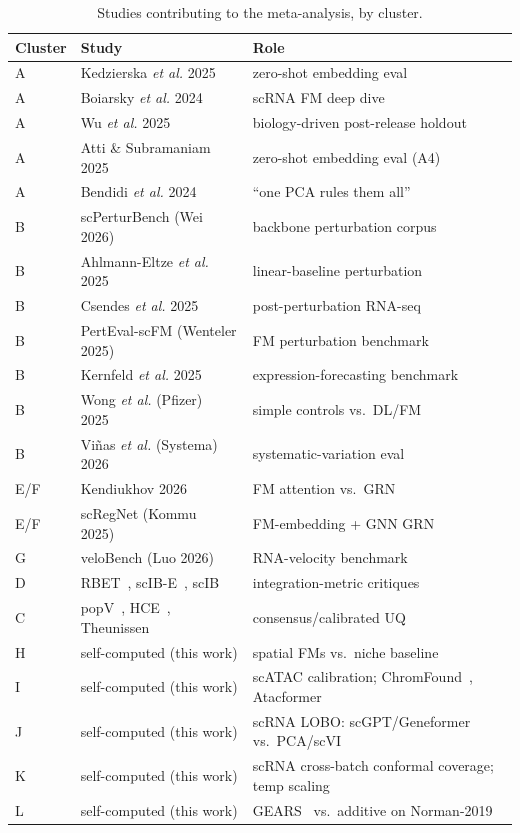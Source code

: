 \documentclass[fleqn,10pt,lineno]{wlpeerj}  %
\begin{document}
\begin{table}[htbp]\centering\footnotesize
\caption{Studies contributing to the meta-analysis, by cluster.}
\label{tab:corpus}
\begin{tabular}{@{}lll@{}}
\toprule
Cluster & Study & Role \\
\midrule
A & Kedzierska \emph{et al.} 2025~\cite{kedzierska2025} & zero-shot embedding eval \\
A & Boiarsky \emph{et al.} 2024~\cite{boiarsky2024} & scRNA FM deep dive \\
A & Wu \emph{et al.} 2025~\cite{wu2025} & biology-driven post-release holdout \\
A & Atti \& Subramaniam 2025~\cite{atti2025} & zero-shot embedding eval (A4) \\
A & Bendidi \emph{et al.} 2024~\cite{bendidi2024} & ``one PCA rules them all'' \\
B & scPerturBench (Wei 2026)~\cite{scperturbench2025} & backbone perturbation corpus \\
B & Ahlmann-Eltze \emph{et al.} 2025~\cite{ahlmann2025} & linear-baseline perturbation \\
B & Csendes \emph{et al.} 2025~\cite{csendes2025} & post-perturbation RNA-seq \\
B & PertEval-scFM (Wenteler 2025)~\cite{perteval2024} & FM perturbation benchmark \\
B & Kernfeld \emph{et al.} 2025~\cite{kernfeld2025} & expression-forecasting benchmark \\
B & Wong \emph{et al.} (Pfizer) 2025~\cite{wongpfizer2025} & simple controls vs.\ DL/FM \\
B & Vi{\~n}as \emph{et al.} (Systema) 2026~\cite{systema2026} & systematic-variation eval \\
E/F & Kendiukhov 2026~\cite{kendiukhov2026} & FM attention vs.\ GRN \\
E/F & scRegNet (Kommu 2025)~\cite{scregnet2025} & FM-embedding + GNN GRN \\
G & veloBench (Luo 2026)~\cite{velobench2026} & RNA-velocity benchmark \\
D & RBET~\cite{rbet2025}, scIB-E~\cite{scibe2025}, scIB~\cite{luecken2022} & integration-metric critiques \\
C & popV~\cite{popv2024}, HCE~\cite{hce2026}, Theunissen~\cite{theunissen2024} & consensus/calibrated UQ \\
H & self-computed (this work) & spatial FMs vs.\ niche baseline \\
I & self-computed (this work) & scATAC calibration; ChromFound~\cite{chromfound2025}, Atacformer~\cite{atacformer2024} \\
J & self-computed (this work) & scRNA LOBO: scGPT/Geneformer vs.\ PCA/scVI~\cite{lopez2018} \\
K & self-computed (this work) & scRNA cross-batch conformal coverage; temp scaling~\cite{guo2017} \\
L & self-computed (this work) & GEARS~\cite{roohani2024} vs.\ additive on Norman-2019~\cite{norman2019} \\
\bottomrule
\end{tabular}
\end{table}
\end{document}
